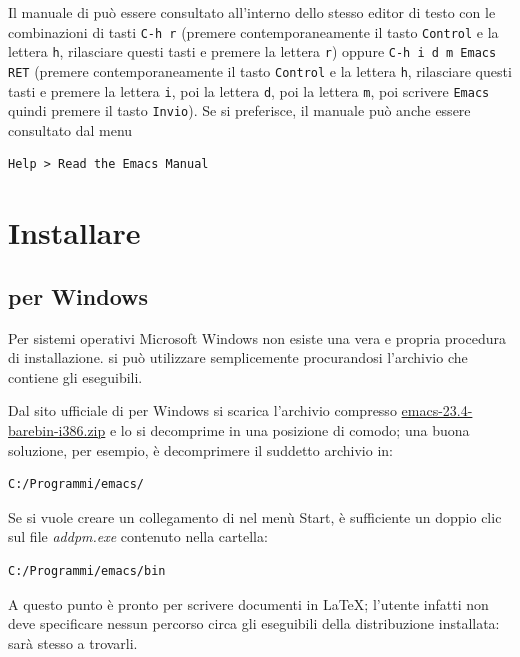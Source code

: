 \documentclass[11pt,a4paper]{article}
\begin{document}
Il manuale di \emacs{} può essere consultato all'interno dello stesso editor di
testo con le combinazioni di tasti \verb!C-h r! (premere contemporaneamente il
tasto \verb!Control! e la lettera \verb!h!, rilasciare questi tasti e premere la
lettera \verb!r!) oppure \verb!C-h i d m Emacs RET! (premere contemporaneamente
il tasto \verb!Control! e la lettera \verb!h!, rilasciare questi tasti e premere
la lettera \verb!i!, poi la lettera \verb!d!, poi la lettera \verb!m!, poi
scrivere \verb!Emacs! quindi premere il tasto \verb!Invio!).  Se si preferisce,
il manuale può anche essere consultato dal menu
\begin{Verbatim}
Help > Read the Emacs Manual
\end{Verbatim}


\section{Installare \emacs}
\label{sec:install}

\subsection{\emacs{} per Windows}
\label{sec:installwin}


Per sistemi operativi Microsoft Windows non esiste una vera e propria
procedura di installazione. \emacs{} si può utilizzare semplicemente
procurandosi l'archivio che contiene gli eseguibili.

Dal sito ufficiale di \emacs{} per Windows %
si scarica l'archivio compresso %
\href{http://ftp.gnu.org/pub/gnu/emacs/windows/emacs-23.4-barebin-i386.zip}
{\textsf{emacs-23.4-barebin-i386.zip}} e lo si decomprime in una
posizione di comodo; una buona soluzione, per esempio, è decomprimere
il suddetto archivio in:
\begin{Verbatim}
C:/Programmi/emacs/
\end{Verbatim}

Se si vuole creare un collegamento di \emacs{} nel menù Start, è
sufficiente un doppio clic sul file \emph{addpm.exe} contenuto nella
cartella:
\begin{Verbatim}
C:/Programmi/emacs/bin
\end{Verbatim}

A questo punto \emacs{} è pronto per scrivere documenti in \LaTeX; l'utente
infatti non deve specificare nessun percorso circa gli eseguibili della
distribuzione installata: sarà \emacs{} stesso a trovarli.
\end{document}
